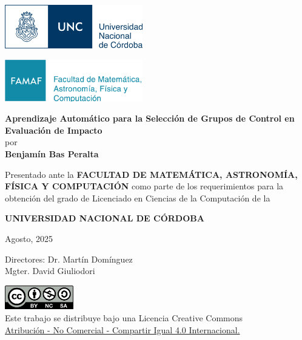 \begin{titlepage}
\begin{center}

    \noindent
    \begin{minipage}[t]{0.5\linewidth}
        \flushleft
        \includegraphics[width=6cm]{logos/unc.png}
    \end{minipage}%
    \begin{minipage}[t]{0.5\linewidth}
        \flushright
        \includegraphics[width=6cm]{logos/famaf.png}
    \end{minipage}

    \vspace{2cm}

    {\LARGE \textbf{Aprendizaje Automático para la Selección de Grupos de Control en
    Evaluación de Impacto}}
    \\[1cm]
    {\large por}
    \\[0.5cm]
    {\Large \textbf{Benjamín Bas Peralta}}

    \vspace{1cm}

    \noindent
    Presentado ante la \textbf{FACULTAD DE MATEMÁTICA, ASTRONOMÍA, FÍSICA Y COMPUTACIÓN}
    como parte de los requerimientos para la obtención del grado de Licenciado en Ciencias
    de la Computación de la

    \textbf{UNIVERSIDAD NACIONAL DE CÓRDOBA}

    \vspace{0.5cm}

    Agosto, 2025

    \vspace{0.5cm}

    Directores: Dr. Martín Domínguez \\ Mgter. David Giuliodori

    \vfill

    \begin{center}
        \includegraphics[width=3cm]{logos/creative-commons.png}\\
        \vspace{0.3cm}
        Este trabajo se distribuye bajo una Licencia Creative Commons \\
        \href{https://creativecommons.org/licenses/by-nc-sa/4.0/deed.es}
        {Atribución - No Comercial - Compartir Igual 4.0 Internacional.}
    \end{center}

\end{center}
\end{titlepage}